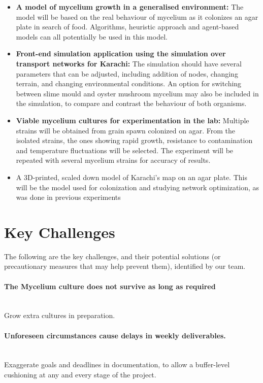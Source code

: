     \begin{itemize}
        \item \textbf{A model of mycelium growth in a generalised environment:} The model will be based on the real behaviour of mycelium as it colonizes an agar plate in search of food. Algorithms, heuristic approach and agent-based models can all potentially be used in this model.
        \item \textbf{Front-end simulation application using the simulation over transport networks for Karachi:} The simulation should have several parameters that can be adjusted, including addition of nodes, changing terrain, and changing environmental conditions. An option for switching between slime mould and oyster mushroom mycelium may also be included in the simulation, to compare and contrast the behaviour of both organisms.
        \item \textbf{Viable mycelium cultures for experimentation in the lab:} Multiple strains will be obtained from grain spawn colonized on agar. From the isolated strains, the ones showing rapid growth, resistance to contamination and temperature fluctuations will be selected. The experiment will be repeated with several mycelium strains for accuracy of results.
        \item A 3D-printed, scaled down model of Karachi's map on an agar plate. This will be the model used for colonization and studying network optimization, as was done in previous experiments \cite{rulesBioDesign} \cite{slimeapprox}
        
    \end{itemize}

\section{Key Challenges}
The following are the key challenges, and their potential solutions (or precautionary measures that may help prevent them), identified by our team.

\paragraph{The Mycelium culture does not survive as long as required}
\mbox{}\\
Grow extra cultures in preparation.

\paragraph{Unforeseen circumstances cause delays in weekly deliverables.}
\mbox{}\\
Exaggerate goals and deadlines in documentation, to allow a buffer-level cushioning at any and every stage of the project.


